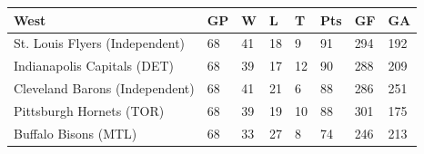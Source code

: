 \documentclass{article}
\begin{document}
\begin{tabular}{llllllll}
\toprule
West & GP & W & L & T & Pts & GF & GA \\
\midrule
St. Louis Flyers (Independent) & 68 & 41 & 18 & 9 & 91 & 294 & 192 \\
Indianapolis Capitals (DET) & 68 & 39 & 17 & 12 & 90 & 288 & 209 \\
Cleveland Barons (Independent) & 68 & 41 & 21 & 6 & 88 & 286 & 251 \\
Pittsburgh Hornets (TOR) & 68 & 39 & 19 & 10 & 88 & 301 & 175 \\
Buffalo Bisons (MTL) & 68 & 33 & 27 & 8 & 74 & 246 & 213 \\
\bottomrule
\end{tabular}
\end{document}
